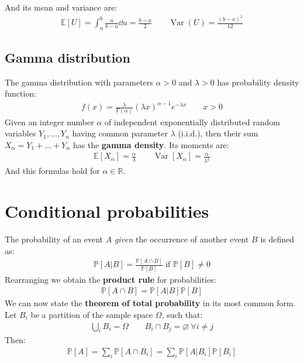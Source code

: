 \documentclass[../template.tex]{subfiles}
\begin{document}
And its mean and variance are:
\begin{align*}
    \mathbb{E}[U] = \int_a^b \frac{u}{b-a} \dd{u} = \frac{b-a}{2}  \qquad \operatorname{Var}(U) = \frac{(b-a)^2}{12}   
\end{align*}

\subsection{Gamma distribution}
The gamma distribution with parameters $\alpha > 0$ and $\lambda > 0$ has probability density function:
\begin{align*}
    f(x) = \frac{\lambda}{\Gamma(\alpha)} (\lambda x)^{\alpha-1} e^{-\lambda x} \qquad x > 0 
\end{align*}
Given an integer number $\alpha$ of independent exponentially distributed random variables $Y_1, \dots, Y_n$ having common parameter $\lambda$ (i.i.d.), then their sum $X_\alpha = Y_1 + \dots + Y_\alpha$ has the \textbf{gamma density}. Its moments are:
\begin{align*}
    \mathbb{E}[X_\alpha] = \frac{\alpha}{\lambda} \qquad \operatorname{Var}[X_\alpha] = \frac{\alpha}{\lambda^2}   
\end{align*}  
And this formulas hold for $\alpha \in \mathbb{R}$.


\section{Conditional probabilities}
The probability of an event $A$ \textit{given} the occurrence of another event $B$ is defined as:
\begin{align*}
    \mathbb{P}[A|B] = \frac{\mathbb{P}[A \cap B]}{\mathbb{P}[B]} \text{ if $\mathbb{P}[B] \neq 0$} 
\end{align*} 
Rearranging we obtain the \textbf{product rule} for probabilities:
\begin{align*}
    \mathbb{P}[A \cap B] = \mathbb{P}[A|B] \mathbb{P}[B]
\end{align*} 
We can now state the \textbf{theorem of total probability} in its most common form. Let $B_i$ be a partition of the sample space $\Omega$, such that:
\begin{align*}
    \bigcup_{i} B_i = \Omega \qquad B_i \cap B_j = \varnothing \> \forall i \neq j
\end{align*}
Then:
\begin{align*}
    \mathbb{P}[A] = \sum_{i} \mathbb{P}[A \cap B_i] = \sum_i \mathbb{P}[A|B_i] \mathbb{P}[B_i]
\end{align*}
\end{document}
